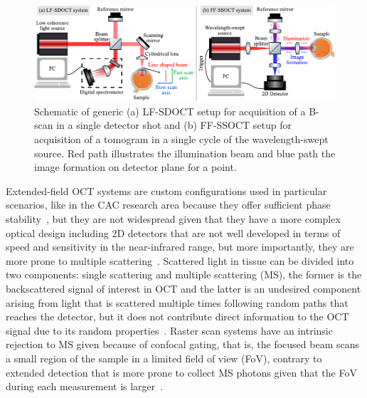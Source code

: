 \begin{figure}
    \centering
    \includegraphics[width=\textwidth]{Figures/TheoreticalBasis/LF_FFOCT_Scheme.pdf}
    \caption[Schematic of generic LF-SDOCT and FF-OSCT setups.]{Schematic of generic (a) LF-SDOCT setup for acquisition of a B-scan in a single detector shot and (b) FF-SSOCT setup for acquisition of a tomogram in a single cycle of the wavelength-swept source. Red path illustrates the illumination beam and blue path the image formation on detector plane for a point.}
    \label{fig:LF_FFOCT_Scheme}
\end{figure}

Extended-field OCT systems are custom configurations used in particular scenarios, like in the CAC research area because they offer sufficient phase stability~\cite{Kumar2013_Subaperture, Hillmann2016_Aberrationfree}, but they are not widespread given that they have a more complex optical design including 2D detectors that are not well developed in terms of speed and sensitivity in the near-infrared range, but more importantly, they are more prone to multiple scattering~\cite{Karamata2005_Multiple}. Scattered light in tissue can be divided into two components: single scattering and multiple scattering (MS), the former is the backscattered signal of interest in OCT and the latter is an undesired component arising from light that is scattered multiple times following random paths that reaches the detector, but it does not contribute direct information to the OCT signal due to its random properties~\cite{Karamata2005_Multiple-1}. Raster scan systems have an intrinsic rejection to MS given because of confocal gating, that is, the focused beam scans a small region of the sample in a limited field of view (FoV), contrary to extended detection that is more prone to collect MS photons given that the FoV during each measurement is larger~\cite{Karamata2005_Multiple}.

